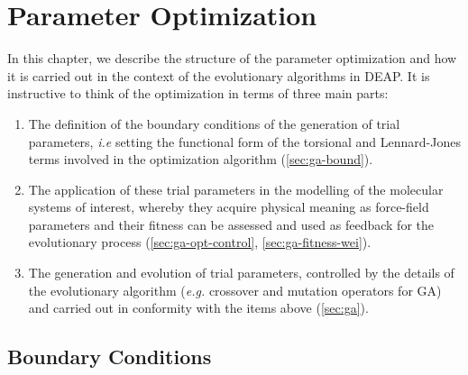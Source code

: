 \documentclass[10pt,a4paper,openany]{memoir}
\numberwithin{equation}{section}
\begin{document}
\chapter{Parameter Optimization}
\label{chap:ga}

%
%
%

In this chapter, we describe the structure of the parameter
optimization and how it is carried out in the context of the
evolutionary algorithms in DEAP.  It is instructive to think of the
optimization in terms of three main parts:
\begin{enumerate}
\item The definition of the boundary conditions of the generation of
  trial parameters, \textit{i.e} setting the functional form of the
  torsional and Lennard-Jones terms involved in the optimization algorithm
  (\autoref{sec:ga-bound}).

\item The application of these trial parameters in the modelling of
  the molecular systems of interest, whereby they acquire physical
  meaning as force-field parameters and their fitness can be assessed
  and used as feedback for the evolutionary process
  (\autoref{sec:ga-opt-control}, \autoref{sec:ga-fitness-wei}).
  
\item The generation and evolution of trial parameters, controlled by
  the details of the evolutionary algorithm (\textit{e.g.} crossover
  and mutation operators for GA) and carried out in conformity with
  the items above (\autoref{sec:ga}).
\end{enumerate}

\section{Boundary Conditions}
\label{sec:ga-bound}
\end{document}
